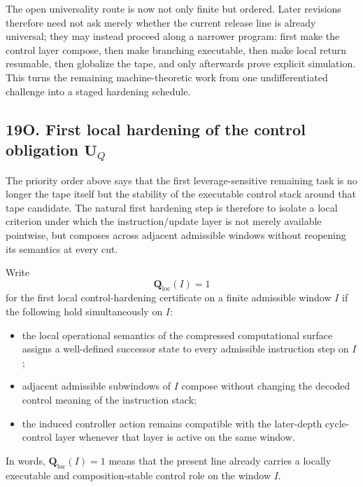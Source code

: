\begin{corollary}
The open universality route is now not only finite but ordered. Later revisions therefore need not ask merely whether the current release line is already universal; they may instead proceed along a narrower program: first make the control layer compose, then make branching executable, then make local return resumable, then globalize the tape, and only afterwards prove explicit simulation. This turns the remaining machine-theoretic work from one undifferentiated challenge into a staged hardening schedule.
\end{corollary}



\subsection*{19O. First local hardening of the control obligation $\mathbf U_Q$}
The priority order above says that the first leverage-sensitive remaining task is no longer the tape itself but the stability of the executable control stack around that tape candidate. The natural first hardening step is therefore to isolate a local criterion under which the instruction/update layer is not merely available pointwise, but composes across adjacent admissible windows without reopening its semantics at every cut.

\begin{definition}
Write
\[
\mathbf Q_{\mathrm{loc}}(I)=1
\]
for the first local control-hardening certificate on a finite admissible window $I$ if the following hold simultaneously on $I$:
\begin{itemize}[leftmargin=2em]
  \item the local operational semantics of the compressed computational surface assigns a well-defined successor state to every admissible instruction step on $I$;
  \item adjacent admissible subwindows of $I$ compose without changing the decoded control meaning of the instruction stack;
  \item the induced controller action remains compatible with the later-depth cycle-control layer whenever that layer is active on the same window.
\end{itemize}
In words, $\mathbf Q_{\mathrm{loc}}(I)=1$ means that the present line already carries a locally executable and composition-stable control role on the window $I$.
\end{definition}

